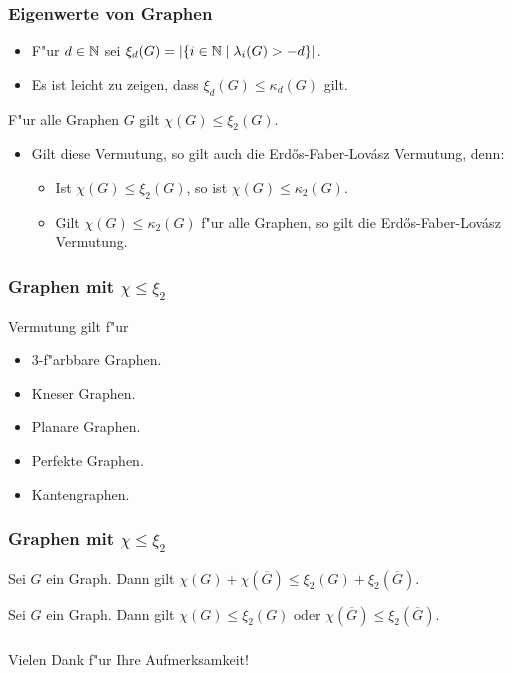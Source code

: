 \documentclass{beamer}
\begin{document}
  \begin{frame}[<+->]
    \frametitle{Eigenwerte von Graphen}
    \begin{itemize}[<+->]
      \item F"ur $d\in {\mathbb{N}}$ sei $\xi_{d}(G) = | \{i \in {\mathbb{N}} \;|\; \lambda_{i}(G) > -d \}|$.
      \item Es ist leicht zu zeigen, dass $\xi_{d}(G) \leq \kappa_{d}(G)$ gilt.
    \end{itemize}
    \begin{conjecture}
      F"ur alle Graphen $G$ gilt $\chi(G) \leq \xi_{2}(G)$.
    \end{conjecture}
    \begin{itemize}[<+->]
      \item Gilt diese Vermutung, so gilt auch die Erd\H os-Faber-Lov\'asz Vermutung, denn:
        \begin{itemize}[<+->]
          \item Ist $\chi(G) \leq \xi_{2}(G)$, so ist $\chi(G) \leq \kappa_{2}(G)$.
          \item Gilt $\chi(G) \leq \kappa_{2}(G)$ f"ur alle Graphen, so gilt die Erd\H os-Faber-Lov\'asz Vermutung.
        \end{itemize}
    \end{itemize}
  \end{frame}

  \begin{frame}[<+->]
    \frametitle{Graphen mit $\chi \leq \xi_{2}$}
    \pause
    Vermutung gilt f"ur 
    \pause
    \begin{itemize}
      \item $3$-f"arbbare Graphen.
      \item Kneser Graphen.
      \item Planare Graphen.
      \item Perfekte Graphen.
      \item Kantengraphen.
    \end{itemize}
  \end{frame}
  \begin{frame}[<+->]
    \frametitle{Graphen mit $\chi \leq \xi_{2}$}
    \begin{proposition}
      Sei $G$ ein Graph. Dann gilt $\chi(G) + \chi(\overline G) \leq \xi_{2}(G) + \xi_{2}(\overline G)$.
    \end{proposition}
    \begin{cor}
      Sei $G$ ein Graph. Dann gilt $\chi(G) \leq \xi_{2}(G) \text{ oder } \chi(\overline G) \leq \xi_{2}(\overline G)$.
    \end{cor}
  \end{frame}

  \begin{frame}
    \frametitle{}
    \begin{center}
      Vielen Dank f"ur Ihre Aufmerksamkeit!
    \end{center}
  \end{frame}
  
\end{document}
